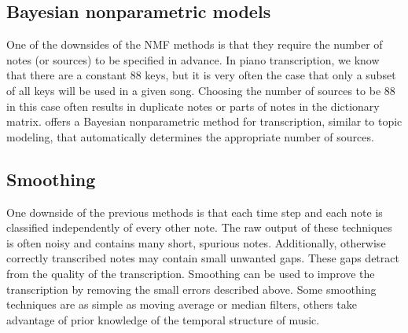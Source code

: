 \documentclass[5p]{elsarticle}
\begin{document}
\subsection{Bayesian nonparametric models}
One of the downsides of the NMF methods is that they require the number of notes (or sources) to be specified in advance. In piano transcription, we know that there are a constant 88 keys, but it is very often the case that only a subset of all keys will be used in a given song. Choosing the number of sources to be 88 in this case often results in duplicate notes or parts of notes in the dictionary matrix. \citet{blei2010bayesian} offers a Bayesian nonparametric method for transcription, similar to topic modeling, that automatically determines the appropriate number of sources.

\subsection{Smoothing}
One downside of the previous methods is that each time step and each note is classified independently of every other note. The raw output of these techniques is often noisy and contains many short, spurious notes. Additionally, otherwise correctly transcribed notes may contain small unwanted gaps. These gaps detract from the quality of the transcription. Smoothing can be used to improve the transcription by removing the small errors described above. Some smoothing techniques are as simple as moving average or median filters, others take advantage of prior knowledge of the temporal structure of music.
\end{document}
